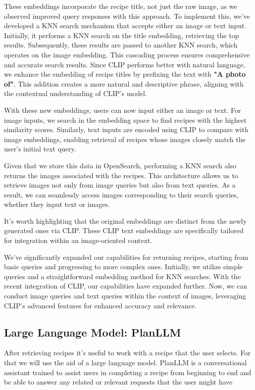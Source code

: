 \documentclass[runningheads]{llncs}
\begin{document}
These embeddings incorporate the recipe title, not just the raw image, as we observed improved query responses with this approach. To implement this, we've developed a KNN search mechanism that accepts either an image or text input. Initially, it performs a KNN search on the title embedding, retrieving the top results. Subsequently, these results are passed to another KNN search, which operates on the image embedding. This cascading process ensures comprehensive and accurate search results. Since CLIP performs better with natural language, we enhance the embedding of recipe titles by prefixing the text with \textbf{"A photo of"}. This addition creates a more natural and descriptive phrase, aligning with the contextual understanding of CLIP's model.

With these new embeddings, users can now input either an image or text. For image inputs, we search in the embedding space to find recipes with the highest similarity scores. Similarly, text inputs are encoded using CLIP to compare with image embeddings, enabling retrieval of recipes whose images closely match the user's initial text query. 


Given that we store this data in OpenSearch, performing a KNN search also returns the images associated with the recipes. This architecture allows us to retrieve images not only from image queries but also from text queries. As a result, we can seamlessly access images corresponding to their search queries, whether they input text or images.

It's worth highlighting that the original embeddings are distinct from the newly generated ones via CLIP. These CLIP text embeddings are specifically tailored for integration within an image-oriented context. 

We've significantly expanded our capabilities for returning recipes, starting from basic queries and progressing to more complex ones. Initially, we utilize simple queries and a straightforward embedding method for KNN searches. With the recent integration of CLIP, our capabilities have expanded further. Now, we can conduct image queries and text queries within the context of images, leveraging CLIP's advanced features for enhanced accuracy and relevance.

\subsection{Large Language Model: PlanLLM}
After retrieving recipes it's useful to work with a recipe that the user selects. For that we will use the aid of a large language model. PlanLLM is a conversational assistant trained to assist users in completing a recipe from beginning to end and be able to answer any related or relevant requests that the user might have ~\cite{planllmeacl24}
\end{document}
